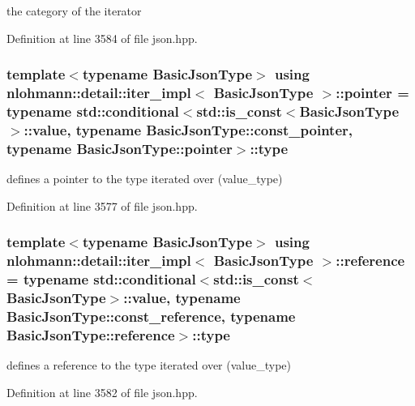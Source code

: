 the category of the iterator 



Definition at line 3584 of file json.\+hpp.

\subsubsection[{\texorpdfstring{pointer}{pointer}}]{\setlength{\rightskip}{0pt plus 5cm}template$<$typename Basic\+Json\+Type$>$ using {\bf nlohmann\+::detail\+::iter\+\_\+impl}$<$ Basic\+Json\+Type $>$\+::{\bf pointer} =  typename std\+::conditional$<$std\+::is\+\_\+const$<$Basic\+Json\+Type$>$\+::{\bf value}, typename Basic\+Json\+Type\+::const\+\_\+pointer, typename Basic\+Json\+Type\+::pointer$>$\+::type}\hypertarget{classnlohmann_1_1detail_1_1iter__impl_a69e52f890ce8c556fd68ce109e24b360}{}\label{classnlohmann_1_1detail_1_1iter__impl_a69e52f890ce8c556fd68ce109e24b360}


defines a pointer to the type iterated over (value\+\_\+type) 



Definition at line 3577 of file json.\+hpp.

\subsubsection[{\texorpdfstring{reference}{reference}}]{\setlength{\rightskip}{0pt plus 5cm}template$<$typename Basic\+Json\+Type$>$ using {\bf nlohmann\+::detail\+::iter\+\_\+impl}$<$ Basic\+Json\+Type $>$\+::{\bf reference} =  typename std\+::conditional$<$std\+::is\+\_\+const$<$Basic\+Json\+Type$>$\+::{\bf value}, typename Basic\+Json\+Type\+::const\+\_\+reference, typename Basic\+Json\+Type\+::reference$>$\+::type}\hypertarget{classnlohmann_1_1detail_1_1iter__impl_a5be8001be099c6b82310f4d387b953ce}{}\label{classnlohmann_1_1detail_1_1iter__impl_a5be8001be099c6b82310f4d387b953ce}


defines a reference to the type iterated over (value\+\_\+type) 



Definition at line 3582 of file json.\+hpp.

